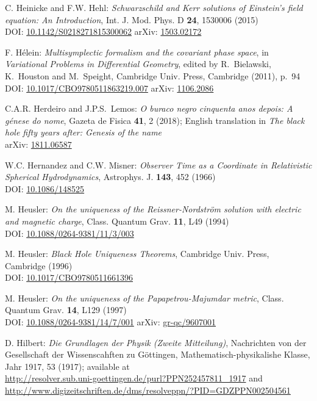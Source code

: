\begin{thebibliography}{123}
C. Heinicke and F.W. Hehl:
{\em Schwarzschild and Kerr solutions of Einstein's field equation: An Introduction},
Int. J. Mod. Phys. D {\bf 24}, 1530006 (2015)\\
DOI: \href{https://doi.org/10.1142/S0218271815300062}{10.1142/S0218271815300062}\hfill
arXiv: \href{https://arxiv.org/abs/1503.02172}{1503.02172}

F. Hélein:
{\em Multisymplectic formalism and the covariant phase space},
in {\em Variational Problems in Differential Geometry},
edited by R.~Bielawski, K.~Houston and M.~Speight,
Cambridge Univ. Press, Cambridge (2011), p.~94\\
DOI: \href{https://doi.org/10.1017/CBO9780511863219.007}{10.1017/CBO9780511863219.007}\hfill
arXiv: \href{https://arxiv.org/abs/1106.2086}{1106.2086}

C.A.R. Herdeiro and J.P.S.~Lemos:
\emph{O buraco negro cinquenta anos depois:
A génese do nome},
Gazeta de Fisica {\bf 41}, 2 (2018); English translation in
\emph{The black hole fifty years after: Genesis of the name}\\
arXiv: \href{https://arxiv.org/abs/1811.06587}{1811.06587}

W.C. Hernandez and C.W. Misner:
{\em Observer Time as a Coordinate in Relativistic Spherical Hydrodynamics},
Astrophys. J. {\bf 143}, 452 (1966) \\
DOI: \href{https://doi.org/10.1086/148525}{10.1086/148525}

M. Heusler:
{\em On the uniqueness of the Reissner-Nordström solution with electric and magnetic charge},
Class. Quantum Grav. {\bf 11}, L49 (1994)\\
DOI: \href{https://doi.org/10.1088/0264-9381/11/3/003}{10.1088/0264-9381/11/3/003}

M. Heusler:
{\em Black Hole Uniqueness Theorems},
Cambridge Univ. Press, Cambridge (1996) \\
DOI: \href{https://doi.org/10.1017/CBO9780511661396}{10.1017/CBO9780511661396}

M. Heusler:
{\em On the uniqueness of the Papapetrou-Majumdar metric},
Class. Quantum Grav. {\bf 14}, L129 (1997)\\
DOI: \href{https://doi.org/10.1088/0264-9381/14/7/001}{10.1088/0264-9381/14/7/001}\hfill
arXiv: \href{https://arxiv.org/abs/gr-qc/9607001}{gr-qc/9607001}

D. Hilbert:
{\em Die Grundlagen der Physik (Zweite Mitteilung)},
Nachrichten von der Gesellschaft der Wissenscahften zu Göttingen,
Mathematisch-physikalishe Klasse, Jahr 1917, 53 (1917);
available at\\
\url{http://resolver.sub.uni-goettingen.de/purl?PPN252457811_1917} and\\
\url{http://www.digizeitschriften.de/dms/resolveppn/?PID=GDZPPN002504561}


\end{thebibliography}
